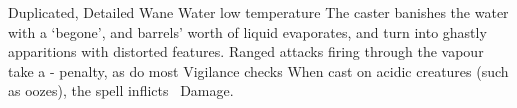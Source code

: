   {Duplicated, Detailed}%
  {Wane}%
  {Water}%
  {low temperature}%
  {The caster banishes the water with a `begone', and  barrels' worth of liquid evaporates, and turn into ghastly apparitions with distorted features.
  Ranged attacks firing through the vapour take a - penalty, as do most Vigilance checks}%
  {
  When cast on acidic creatures (such as oozes), the spell inflicts \showDam\ Damage.}
